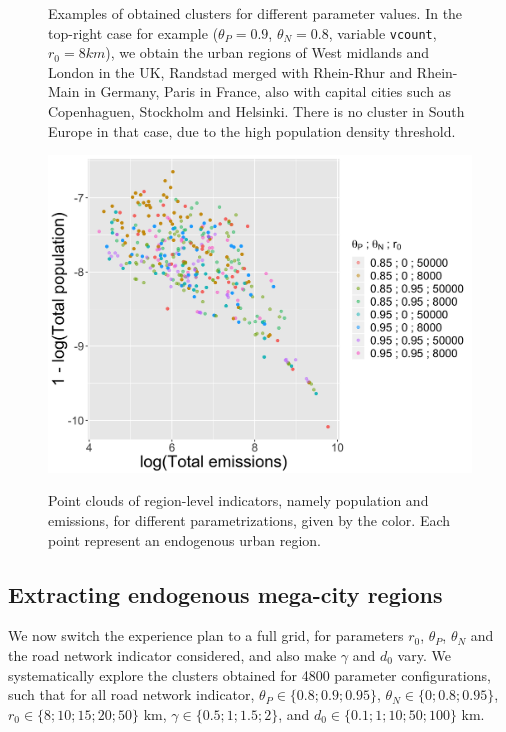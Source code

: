 \documentclass{jimis-en}
\begin{document}
\begin{figure}[h!]
  \caption{Examples of obtained clusters for different parameter values. In the top-right case for example ($\theta_P = 0.9$, $\theta_N = 0.8$, variable \texttt{vcount},$r_0 = 8km$), we obtain the urban regions of West midlands and London in the UK, Randstad merged with Rhein-Rhur and Rhein-Main in Germany, Paris in France, also with capital cities such as Copenhaguen, Stockholm and Helsinki. There is no cluster in South Europe in that case, due to the high population density threshold.\label{fig:exclusters}}
\end{figure}


\begin{figure}[h!] 
  {\includegraphics[width=0.7\linewidth]{figures/full_effective_pareto.png}}
  \centering
  \caption{Point clouds of region-level indicators, namely population and emissions, for different parametrizations, given by the color. Each point represent an endogenous urban region.\label{fig:paretos}}
\end{figure}

\subsection{Extracting endogenous mega-city regions}


We now switch the experience plan to a full grid, for parameters $r_0$, $\theta_P$, $\theta_N$ and the road network indicator considered, and also make $\gamma$ and $d_0$ vary. We systematically explore the clusters obtained for 4800 parameter configurations, such that for all road network indicator, $\theta_P \in \{ 0.8 ; 0.9 ; 0.95 \}$, $\theta_N \in \{0 ; 0.8 ; 0.95 \}$, $r_0 \in \{ 8 ; 10 ; 15 ; 20 ; 50\}$ km, $\gamma \in \{ 0.5 ; 1 ; 1.5 ; 2\}$, and $d_0 \in \{ 0.1 ; 1 ; 10 ; 50 ; 100\}$ km.
\end{document}
